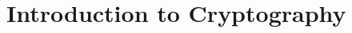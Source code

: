 \documentclass[../main]{subfiles}
\begin{document}
\chapter{Introduction to Cryptography}
\end{document}

